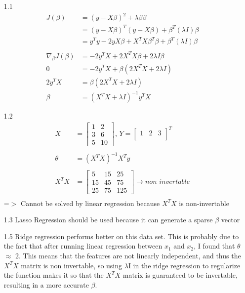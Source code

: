 \documentclass{article}
\begin{document}
\begin{enumerate}
\item[1.1]
\begin{align*}
	J(\beta) & = (y-X\beta)^2 + \lambda\beta\beta \\
	& = (y-X\beta)^T(y-X\beta) + \beta^T(\lambda I)\beta \\
	& = y^Ty - 2yX\beta + X^TX\beta^T\beta + \beta^T(\lambda I)\beta \\
			\\
	\nabla_\beta J(\beta) & = -2y^TX + 2X^TX\beta + 2\lambda I \beta \\
	0 & = -2y^TX + \beta(2X^TX + 2\lambda I) \\
	2y^TX & = \beta(2X^TX + 2\lambda I) \\
	\beta & = (X^TX + \lambda I)^{-1} y^TX 
\end{align*}

\item[1.2]
\begin{align*}
X & =
\begin{bmatrix}
  1 & 2 \\
  3 & 6 \\
  5 & 10
\end{bmatrix}, 
\,Y = 
\begin{bmatrix}
  1 & 2 & 3 \\
\end{bmatrix}^T \\
\\
\theta & = (X^TX)^{-1}X^Ty \\ \\
X^TX & = 
\begin{bmatrix}
  5 & 15 & 25 \\
  15 & 45 & 75\\
  25 & 75 & 125
\end{bmatrix} \longrightarrow non\,\,invertable \\
\end{align*}
=$>$ Cannot be solved by linear regression because $X^TX$ is non-invertable\\
\item[1.3]
Lasso Regression should be used because it can generate a sparse $\beta$ vector\\
\item[1.5]
Ridge regression performs better on this data set. This is probably due to the fact that after running linear regression between $x_1$ and $x_2$, I found that $\theta$ $\approx$ 2. This means that the features are not linearly independent, and thus the $X^TX$ matrix is non invertable, so using $\lambda$I in the ridge regression to regularize the function makes it so that the $X^TX$ matrix is guaranteed to be invertable, resulting in a more accurate $\beta$.
\end{enumerate}
\end{document}

